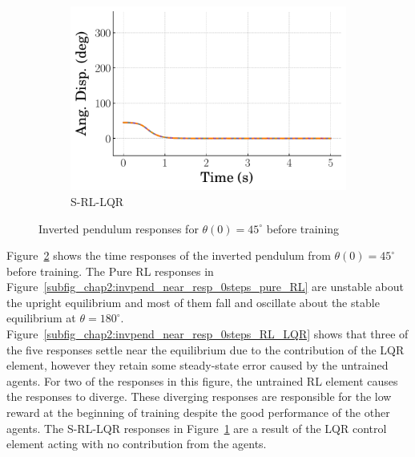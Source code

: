 \begin{figure}[h!]
    \hfill
    \begin{subfigure}[b]{0.49\textwidth}
        \centering
        \includegraphics[width=\textwidth]{figures/figures_RL_model_based_control/time_responses_invpend/invpend_switching/Angular_displacement_45_init_0_steps.pdf}
        \caption{S-RL-LQR}
        \label{subfig_chap2:invpend_near_resp_0steps_S_RL_LQR}
    \end{subfigure}
    \caption{Inverted pendulum responses for $\theta(0)=45^{\circ}$ before training}
    \label{fig_chap2:invpend_near_resp_0steps}
\end{figure}

Figure~\ref{fig_chap2:invpend_near_resp_0steps} shows the time responses of the inverted pendulum from $\theta(0)=45^{\circ}$ before training. The Pure RL responses in Figure~\ref{subfig_chap2:invpend_near_resp_0steps_pure_RL} are unstable about the upright equilibrium and most of them fall and oscillate about the stable equilibrium at $\theta=180^{\circ}$. Figure~\ref{subfig_chap2:invpend_near_resp_0steps_RL_LQR} shows that three of the five responses settle near the equilibrium due to the contribution of the LQR element, however they retain some steady-state error caused by the untrained agents. For two of the responses in this figure, the untrained RL element causes the responses to diverge. These diverging responses are responsible for the low reward at the beginning of training despite the good performance of the other agents. The S-RL-LQR responses in Figure~\ref{subfig_chap2:invpend_near_resp_0steps_S_RL_LQR} are a result of the LQR control element acting with no contribution from the agents.

